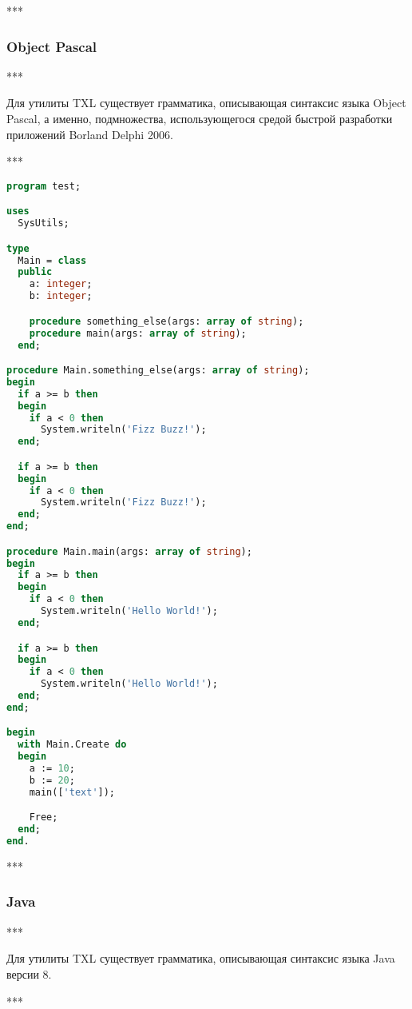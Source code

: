 ***

\subsubsection{Object Pascal}

***

Для утилиты TXL существует грамматика, описывающая синтаксис языка Object Pascal, а именно, подмножества, использующегося средой быстрой разработки приложений Borland Delphi 2006.

***

\begin{lstlisting}[frame=single, language=Pascal, label={test-delphi}, caption={Исходный текст тестового приложения}]
program test;

uses
  SysUtils;

type
  Main = class
  public
    a: integer;
    b: integer;

    procedure something_else(args: array of string);
    procedure main(args: array of string);
  end;

procedure Main.something_else(args: array of string);
begin
  if a >= b then
  begin
    if a < 0 then
      System.writeln('Fizz Buzz!');
  end;

  if a >= b then
  begin
    if a < 0 then
      System.writeln('Fizz Buzz!');
  end;
end;

procedure Main.main(args: array of string);
begin
  if a >= b then
  begin
    if a < 0 then
      System.writeln('Hello World!');
  end;

  if a >= b then
  begin
    if a < 0 then
      System.writeln('Hello World!');
  end;
end;

begin
  with Main.Create do
  begin
    a := 10;
    b := 20;
    main(['text']);

    Free;
  end;
end.
\end{lstlisting}

***

\subsubsection{Java}

***

Для утилиты TXL существует грамматика, описывающая синтаксис языка Java версии 8.

***

